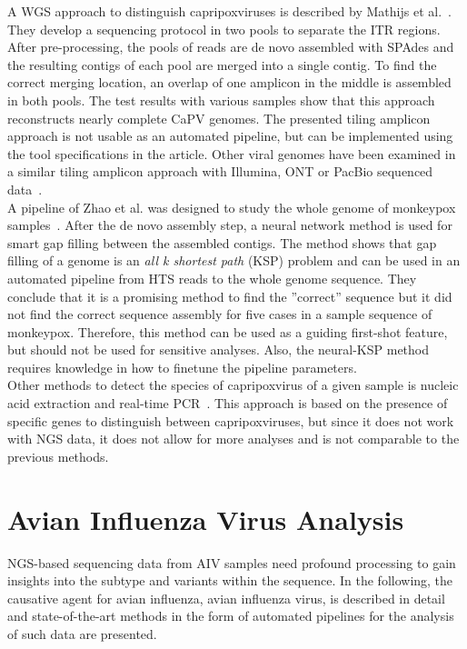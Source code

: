 A \ac{WGS} approach to distinguish capripoxviruses is described by Mathijs et al.~\cite{mathijs2022robust}. They develop a sequencing protocol in two pools to separate the \ac{ITR} regions. After pre-processing, the pools of reads are de novo assembled with SPAdes and the resulting contigs of each pool are merged into a single contig. To find the correct merging location, an overlap of one amplicon in the middle is assembled in both pools. The test results with various samples show that this approach reconstructs nearly complete \acs{CaPV} genomes.
The presented tiling amplicon approach is not usable as an automated pipeline, but can be implemented using the tool specifications in the article. Other viral genomes have been examined in a similar tiling amplicon approach with Illumina, \ac{ONT} or PacBio sequenced data~\cite{freed2020rapid, gardner2014multiplex, grubaugh2019amplicon, quick2017multiplex}. \\
A pipeline of Zhao et al. was designed to study the whole genome of monkeypox samples~\cite{zhao2016finishing}. After the de novo assembly step, a neural network method is used for smart gap filling between the assembled contigs. The method shows that gap filling of a genome is an \textit{all k shortest path} (KSP) problem and can be used in an automated pipeline from \ac{HTS} reads to the whole genome sequence. They conclude that it is a promising method to find the ''correct'' sequence but it did not find the correct sequence assembly for five cases in a sample sequence of monkeypox. Therefore, this method can be used as a guiding first-shot feature, but should not be used for sensitive analyses. Also, the neural-\acs{KSP} method requires knowledge in how to finetune the pipeline parameters. \\
Other methods to detect the species of capripoxvirus of a given sample is nucleic acid extraction and real-time \ac{PCR}~\cite{armson2017detection}. This approach is based on the presence of specific genes to distinguish between capripoxviruses, but since it does not work with \ac{NGS} data, it does not allow for more analyses and is not comparable to the previous methods.

\section{Avian Influenza Virus Analysis}\label{sec:AIV}
\ac{NGS}-based sequencing data from \ac{AIV} samples need profound processing to gain insights into the subtype and variants within the sequence. In the following, the causative agent for avian influenza, avian influenza virus, is described in detail and state-of-the-art methods in the form of automated pipelines for the analysis of such data are presented.

